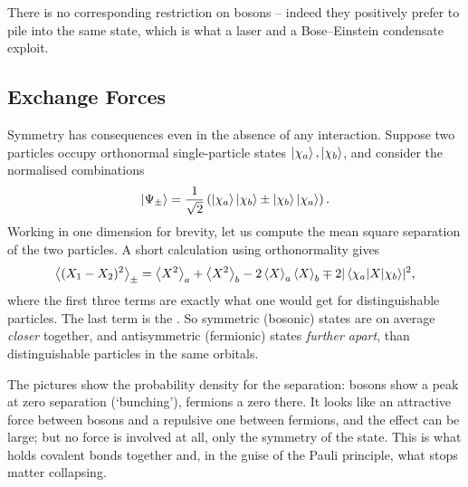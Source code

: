 \documentclass[a4paper]{scrartcl}
\begin{document}
There is no corresponding restriction on bosons -- indeed they positively prefer to pile into the same state, which is what a laser and a Bose--Einstein condensate exploit.

\subsection{Exchange Forces}

Symmetry has consequences even in the absence of any interaction. Suppose two particles occupy orthonormal single-particle states $\ket{\chi_a}, \ket{\chi_b}$, and consider the normalised combinations
$$
\ket{\Psi_\pm} = \frac{1}{\sqrt2}\left( \ket{\chi_a}\ket{\chi_b} \pm \ket{\chi_b}\ket{\chi_a} \right).
$$
Working in one dimension for brevity, let us compute the mean square separation of the two particles. A short calculation using orthonormality gives
$$
\expval{(X_1 - X_2)^2}_\pm = \expval{X^2}_a + \expval{X^2}_b - 2\expval{X}_a\expval{X}_b \mp 2\lvert\mel{\chi_a}{X}{\chi_b}\rvert^2,
$$
where the first three terms are exactly what one would get for distinguishable particles. The last term is the . So symmetric (bosonic) states are on average \emph{closer} together, and antisymmetric (fermionic) states \emph{further apart}, than distinguishable particles in the same orbitals.

\begin{center}
\end{center}

The pictures show the probability density for the separation: bosons show a peak at zero separation (`bunching'), fermions a zero there. It looks like an attractive force between bosons and a repulsive one between fermions, and the effect can be large; but no force is involved at all, only the symmetry of the state. This  is what holds covalent bonds together and, in the guise of the Pauli principle, what stops matter collapsing.
\end{document}
